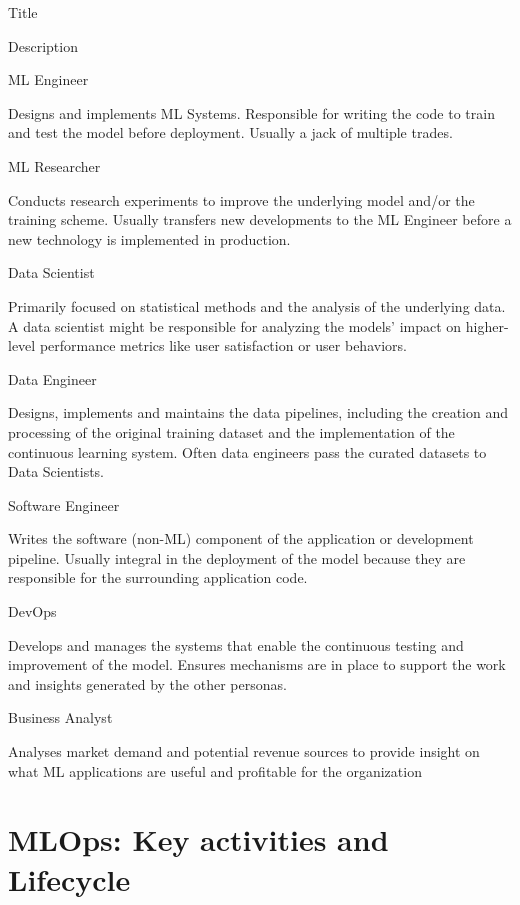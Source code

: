 Title

Description

ML Engineer

Designs and implements ML Systems. Responsible for writing the code to train and test the model before deployment. Usually a jack of multiple trades.

ML Researcher

Conducts research experiments to improve the underlying model and/or the training scheme. Usually transfers new developments to the ML Engineer before a new technology is implemented in production.

Data Scientist

Primarily focused on statistical methods and the analysis of the underlying data. A data scientist might be responsible for analyzing the models’ impact on higher-level performance metrics like user satisfaction or user behaviors.

Data Engineer

Designs, implements and maintains the data pipelines, including the creation and processing of the original training dataset and the implementation of the continuous learning system. Often data engineers pass the curated datasets to Data Scientists.

Software Engineer

Writes the software (non-ML) component of the application or development pipeline. Usually integral in the deployment of the model because they are responsible for the surrounding application code.

DevOps

Develops and manages the systems that enable the continuous testing and improvement of the model. Ensures mechanisms are in place to support the work and insights generated by the other personas.

Business Analyst

Analyses market demand and potential revenue sources to provide insight on what ML applications are useful and profitable for the organization

\section{MLOps: Key activities and Lifecycle}

